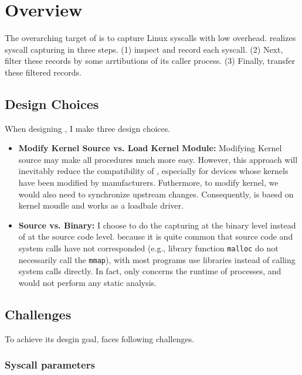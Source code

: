 \section{Overview}

The overarching target of \TheName is to capture Linux syscalls with low overhead. \TheName realizes syscall capturing in three steps. (1) \TheName inspect and record each syscall. (2) Next, \TheName filter these records by some arrtibutions of its caller process. (3) Finally, \TheName transfer these filtered records.

\subsection{Design Choices}

When designing \TheName, I make three design choices.

\begin{itemize}
    \item \textbf{Modify Kernel Source vs. Load Kernel Module:} Modifying Kernel source may make all procedures much more easy. However, this approach will inevitably reduce the compatibility of \TheName, especially for devices whose kernels have been modified by manufacturers. Futhermore, to modify kernel, we would also need to synchronize upstream changes. Consequently, \TheName is baesd on kernel moudle and works as a loadbale driver.
    \item \textbf{Source vs. Binary: }  I choose to do the capturing at
    the binary level instead of at the source code level. because it is quite common that source code and system calls have not corresponded (e.g., library function \texttt{malloc} do not necessarily call the \texttt{mmap}), with most programs use libraries instead of calling system calls directly. In fact, \TheName only concerns the runtime of processes, and would not perform any static analysis.
\end{itemize}

\subsection{Challenges}

To achieve its desgin goal, \TheName faces following challenges.


\subsubsection{Syscall parameters}

